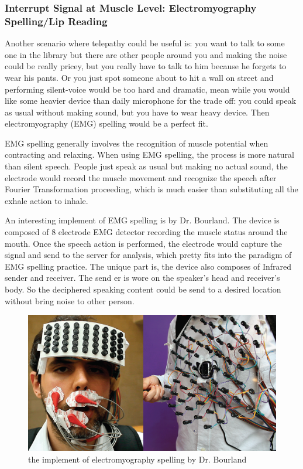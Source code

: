 \documentclass[a4paper]{article}
\begin{document}
\subsubsection{Interrupt Signal at Muscle Level: Electromyography Spelling/Lip Reading}

Another scenario where telepathy could be useful is: you want to talk to some one in the library but there are other people around you and making the noise could be really pricey, but you really have to talk to him because he forgets to wear his pants. Or you just spot someone about to hit a wall on street and performing silent-voice would be too hard and dramatic, mean while you would like some heavier device than daily microphone for the trade off: you could speak as usual without making sound, but you have to wear heavy device. Then electromyography (EMG) spelling would be a perfect fit.

EMG spelling generally involves the recognition of muscle potential when contracting and relaxing. When using EMG spelling, the process is more natural than silent speech. People just speak as usual but making no actual sound, the electrode would record the muscle movement and recognize the speech after Fourier Transformation proceeding, which is much easier than substituting all the exhale action to inhale.

An interesting implement of EMG spelling is by Dr. Bourland. The device is composed of 8 electrode EMG detector recording the muscle status around the mouth. Once the speech action is performed, the electrode would capture the signal and send to the server for analysis, which pretty fits into the paradigm of EMG spelling practice. The unique part is, the device also composes of Infrared sender and receiver. The send er is wore on the speaker's head and receiver's body. So the deciphered speaking content could be send to a desired location without bring noise to other person.  

\begin{figure}
	\centering
	\includegraphics[width= \linewidth]{Proj_Tele}
	\caption{the implement of electromyography spelling by Dr. Bourland}
	\label{fig:Proj_Tele}
\end{figure}
\end{document}
